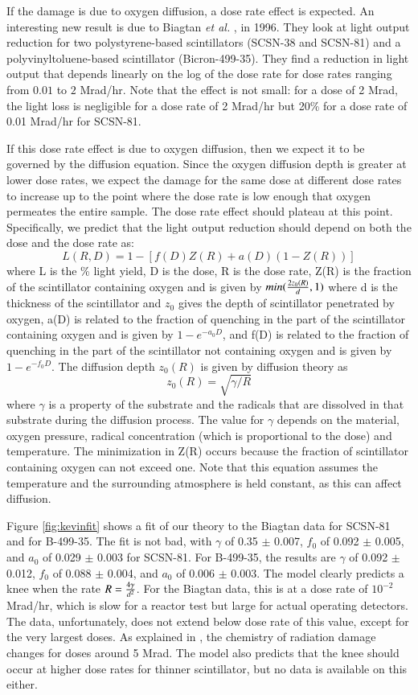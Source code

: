 If the damage is due to oxygen diffusion, a dose rate effect
is expected.
An interesting new result is due to Biagtan {\it{et al.}} \cite{Biagtan1996125}, in 1996.  They look at light output reduction for two
polystyrene-based scintillators (SCSN-38 and SCSN-81) and a
polyvinyltoluene-based scintillator (Bicron-499-35).  
They find a reduction in light output that depends linearly on the
log of the dose rate for dose rates ranging from $0.01$ to
$2$ Mrad/hr.  Note that the effect is not small: for a
dose of 2 Mrad, the light loss is negligible for a dose rate
of 2 Mrad/hr but 20\% for a dose rate of 0.01 Mrad/hr for SCSN-81.

If this dose rate effect is due to oxygen diffusion, then
we expect it to be governed by the diffusion equation.  Since
the oxygen diffusion depth is greater at lower dose rates,
we expect the damage for the same dose at different dose rates to
increase up to the point where the dose rate is low enough that oxygen
permeates the entire sample.  The dose rate effect should plateau
at this point.  Specifically, we predict that the light output
reduction should depend on both the dose and the dose rate as:
$$ L(R,D) = 1 - [f(D)Z(R) + a(D)(1-Z(R))]$$
where L is the \% light yield, D is the dose, R is the dose rate, 
Z(R) is the fraction of the scintillator containing 
oxygen and is given by $min({{2 z_0(R)}\over{d}},1)$
where d is the thickness of the scintillator and $z_0$ gives
the depth of scintillator penetrated by oxygen,
a(D) is related to the fraction of quenching in the part of
the scintillator containing oxygen and is given by $1-e^{-a_0 D}$, 
and
f(D) is related to the fraction of quenching in the part of
the scintillator not containing oxygen and is given by $1-e^{-f_0 D}$.
The diffusion depth $z_0(R)$ is given by diffusion theory as 
$$z_0(R)=\sqrt{\gamma/R}$$
where $\gamma$ is a property of the substrate and the radicals that
are dissolved in that substrate during the diffusion process.
The value for $\gamma$ depends on the material, oxygen pressure,
radical concentration (which is proportional to the dose) and 
temperature.
The minimization in Z(R) occurs because the fraction of scintillator
containing oxygen can not exceed one.  Note that this equation 
assumes the temperature and the surrounding atmosphere
is held constant, as this can 
affect diffusion.

Figure \ref{fig:kevinfit} shows a fit of our theory to the Biagtan data 
\cite{Biagtan1996125} for SCSN-81 and for B-499-35.  The fit is not bad,
with 
$\gamma$ of 0.35 $\pm$ 0.007, $f_0$ of 0.092 $\pm$ 0.005,
and $a_0$ of 0.029 $\pm$ 0.003 
for SCSN-81.  For B-499-35, the results
are 
$\gamma$ of 0.092 $\pm$ 0.012, $f_0$ of 0.088 $\pm$ 0.004,
and $a_0$ of 0.006 $\pm$ 0.003. 
The model clearly predicts a knee when the rate $R={{4 \gamma}\over{d^2}}$.
For the Biagtan data, this is at a dose rate of $10^{-2}$ Mrad/hr, which is
slow for a reactor test but large for actual operating detectors.
The data, unfortunately, does not extend below dose rate of this value,
except for the very largest doses.  As explained in \cite{harrah},
the chemistry of radiation damage changes for doses
around 5 Mrad.
The model also predicts that the knee should occur at higher
dose rates for thinner scintillator, but no data is available
on this either.


